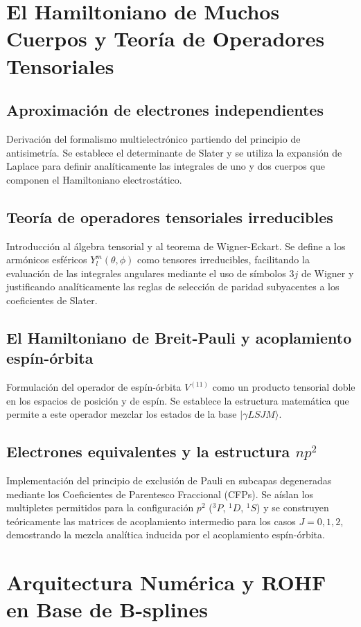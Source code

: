 \documentclass[12pt,a4paper]{book}
\begin{document}
\section{El Hamiltoniano de Muchos Cuerpos y Teoría de Operadores Tensoriales}

\subsection{Aproximación de electrones independientes}
Derivación del formalismo multielectrónico partiendo del principio de antisimetría. Se establece el determinante de Slater y se utiliza la expansión de Laplace para definir analíticamente las integrales de uno y dos cuerpos que componen el Hamiltoniano electrostático.

\subsection{Teoría de operadores tensoriales irreducibles}
Introducción al álgebra tensorial y al teorema de Wigner-Eckart. Se define a los armónicos esféricos $Y_l^m(\theta, \phi)$ como tensores irreducibles, facilitando la evaluación de las integrales angulares mediante el uso de símbolos $3j$ de Wigner y justificando analíticamente las reglas de selección de paridad subyacentes a los coeficientes de Slater.

\subsection{El Hamiltoniano de Breit-Pauli y acoplamiento espín-órbita}
Formulación del operador de espín-órbita $V^{(11)}$ como un producto tensorial doble en los espacios de posición y de espín. Se establece la estructura matemática que permite a este operador mezclar los estados de la base $| \gamma L S J M \rangle$.

\subsection{Electrones equivalentes y la estructura $np^2$}
Implementación del principio de exclusión de Pauli en subcapas degeneradas mediante los Coeficientes de Parentesco Fraccional (CFPs). Se aíslan los multipletes permitidos para la configuración $p^2$ ($^3P$, $^1D$, $^1S$) y se construyen teóricamente las matrices de acoplamiento intermedio para los casos $J=0, 1, 2$, demostrando la mezcla analítica inducida por el acoplamiento espín-órbita.

\section{Arquitectura Numérica y ROHF en Base de B-splines}
\end{document}
